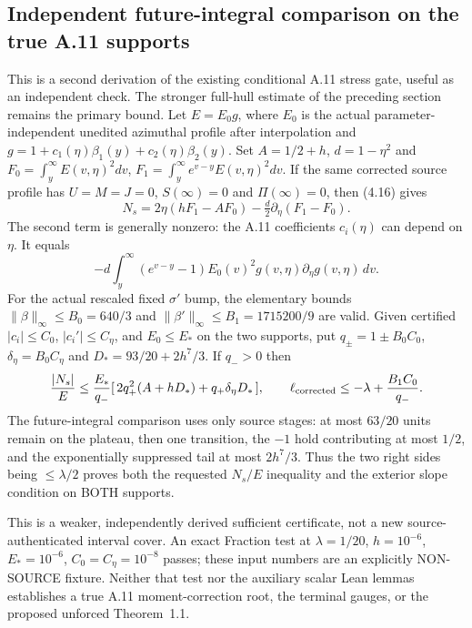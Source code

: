 \subsection*{Independent future-integral comparison on the true A.11 supports}
\label{subsec:a11-direct-future-audit}
This is a second derivation of the existing conditional A.11 stress
gate, useful as an independent check. The stronger full-hull
estimate of the preceding section remains the primary bound.
Let $E=E_0g$, where $E_0$ is the actual parameter-independent
unedited azimuthal profile after interpolation and
$g=1+c_1(\eta)\beta_1(y)+c_2(\eta)\beta_2(y)$.
Set $A=1/2+h$, $d=1-\eta^2$ and
$F_0=\int_y^\infty E(v,\eta)^2dv$,
$F_1=\int_y^\infty e^{v-y}E(v,\eta)^2dv$.
If the same corrected source profile has
$U=M=J=0$, $S(\infty)=0$ and $\Pi(\infty)=0$,
then (4.16) gives
\[
N_s=2\eta(hF_1-AF_0)-\tfrac d2\partial_\eta(F_1-F_0).
\]
The second term is generally nonzero: the A.11 coefficients
$c_i(\eta)$ can depend on $\eta$. It equals
\[
-d\int_y^\infty(e^{v-y}-1)E_0(v)^2
g(v,\eta)\partial_\eta g(v,\eta)\,dv.
\]
For the actual rescaled fixed $\sigma'$ bump, the elementary
bounds $\|\beta\|_\infty\le B_0=640/3$ and
$\|\beta'\|_\infty\le B_1=1715200/9$ are valid.
Given certified $|c_i|\le C_0$, $|c_i'|\le C_\eta$,
and $E_0\le E_*$ on the two supports, put
$q_\pm=1\pm B_0C_0$, $\delta_\eta=B_0C_\eta$
and $D_*=93/20+2h^7/3$. If $q_->0$ then
\[
\frac{|N_s|}{E}\le\frac{E_*}{q_-}
 [\,2q_+^2(A+hD_*)+q_+\delta_\eta D_*\,],
\qquad
\ell_{\rm corrected}\le-\lambda+\frac{B_1 C_0}{q_-}.
\]
The future-integral comparison uses only source stages:
at most $63/20$ units remain on the plateau, then one
transition, the $-1$ hold contributing at most $1/2$,
and the exponentially suppressed tail at most $2h^7/3$.
Thus the two right sides being $\le\lambda/2$ proves both
the requested $N_s/E$ inequality and the exterior slope
condition on BOTH supports.

This is a weaker, independently derived sufficient certificate,
not a new source-authenticated interval cover. An exact Fraction
test at $\lambda=1/20$, $h=10^{-6}$, $E_*=10^{-6}$,
$C_0=C_\eta=10^{-8}$ passes; these input numbers are an explicitly
NON-SOURCE fixture. Neither that test nor the auxiliary scalar
Lean lemmas establishes a true A.11 moment-correction root,
the terminal gauges, or the proposed unforced Theorem~1.1.
